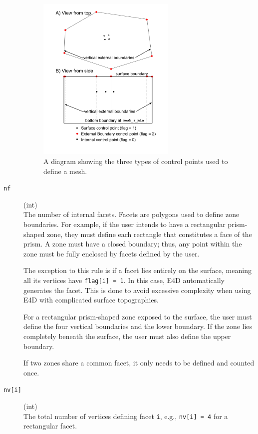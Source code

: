 \documentclass[a4paper,12pt]{article}
\begin{document}
\begin{description}
          \begin{figure}[H]
              \centering
              \includegraphics[width=2.6in]{figures/control_point_flags.png} %
              \caption{A diagram showing the three types of control points used to define a mesh.}
              \label{fig:screenshot}
          \end{figure}

    \item[\texttt{nf}] (int)\hfill \\
          The number of internal facets. Facets are polygons used to define zone boundaries. For example, if the user intends to have a rectangular prism-shaped zone, they must define each rectangle that constitutes a face of the prism. A zone must have a closed boundary; thus, any point within the zone must be fully enclosed by facets defined by the user.

          The exception to this rule is if a facet lies entirely on the surface, meaning
          all its vertices have \texttt{flag[i] = 1}. In this case, E4D automatically
          generates the facet. This is done to avoid excessive complexity when using E4D
          with complicated surface topographies.

          For a rectangular prism-shaped zone exposed to the surface, the user must
          define the four vertical boundaries and the lower boundary. If the zone lies
          completely beneath the surface, the user must also define the upper boundary.

          If two zones share a common facet, it only needs to be defined and counted
          once.

    \item[\texttt{nv[i]}] (int)\hfill \\
          The total number of vertices defining facet \texttt{i}, e.g., \texttt{nv[i] = 4} for a rectangular facet.


\end{description}
\end{document}
